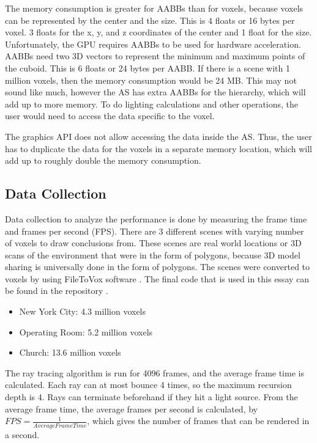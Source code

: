 \documentclass[12pt]{article}
\begin{document}
The memory consumption is greater for AABBs than for voxels, because voxels can be represented by the center and the size.
This is 4 floats or 16 bytes per voxel. 3 floats for the x, y, and z coordinates of the center and 1 float for the size.
Unfortunately, the GPU requires AABBs to be used for hardware acceleration.
AABBs need two 3D vectors to represent the minimum and maximum points of the cuboid.
This is 6 floats or 24 bytes per AABB.
If there is a scene with 1 million voxels, then the memory consumption would be 24 MB.
This may not sound like much, however the AS has extra AABBs for the hierarchy, which will add up to more memory.
To do lighting calculations and other operations, the user would need to access the data specific to the voxel.


The graphics API does not allow accessing the data inside the AS. Thus, the user has to duplicate the data for the voxels in a separate
memory location, which will add up to roughly double the memory consumption.

\subsection{Data Collection}

Data collection to analyze the performance is done by measuring the frame time and frames per second (FPS).
There are 3 different scenes with varying number of voxels to draw conclusions from.
These scenes are real world locations or 3D scans of the environment that were in the form of polygons, because 3D model sharing
is universally done in the form of polygons.
The scenes were converted to voxels by using FileToVox software \parencite{Github:FileToVox}.
The final code that is used in this essay can be found in the repository  \parencite{Github:FastVoxels}.

\begin{itemize}
    \itemsep0em
    \item New York City: 4.3 million voxels \parencite{SketchFab:NewYorkCity}
    \item Operating Room: 5.2 million voxels \parencite{SketchFab:OperatingRoom}
    \item Church: 13.6 million voxels \parencite{SketchFab:Church}
\end{itemize}

The ray tracing algorithm is run for 4096 frames, and the average frame time is calculated.
Each ray can at most bounce 4 times, so the maximum recursion depth is 4.
Rays can terminate beforehand if they hit a light source.
From the average frame time, the average frames per second is calculated, by $FPS = \frac{1}{Average Frame Time}$,
which gives the number of frames that can be rendered in a second.
\end{document}
